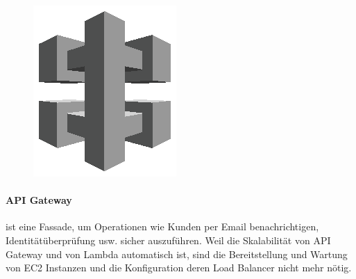 \documentclass[
12pt,
english,
ngerman,
headsepline,
twoside,
openright,
numbers=noenddot,version=first
]{scrreprt}
\begin{document}
\begin{figure}
	\includegraphics[width=0.9\linewidth]{./pics/aws/MobileServices_GRAYSCALE_AmazonAPIGateway.eps}
\end{figure}
\paragraph{API Gateway} ist eine Fassade, um Operationen wie Kunden per Email benachrichtigen, Identitätüberprüfung usw. sicher auszuführen. Weil die Skalabilität von API Gateway und von Lambda automatisch ist, sind die Bereitstellung und Wartung von EC2 Instanzen und die Konfiguration deren Load Balancer nicht mehr nötig. 
\end{document}
